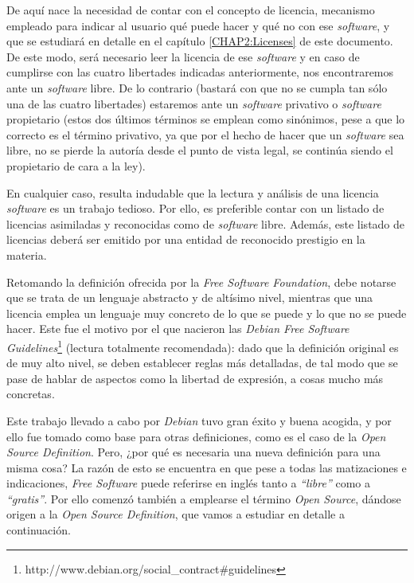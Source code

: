 De aquí nace la necesidad de contar con el concepto de licencia, mecanismo
empleado para indicar al usuario qué puede hacer y qué no con ese
\textit{software}, y que se estudiará en detalle en el capítulo
\ref{CHAP2:Licenses} de este documento. De este modo, será necesario
leer la licencia de ese \textit{software} y en caso de cumplirse con las cuatro
libertades indicadas anteriormente, nos encontraremos ante un \textit{software}
libre. De lo contrario (bastará con que no se cumpla tan sólo una de las cuatro
libertades) estaremos ante un \textit{software} privativo o \textit{software}
propietario (estos dos últimos términos se emplean como sinónimos, pese a que lo
correcto es el término privativo, ya que por el hecho de hacer que un
\textit{software} sea libre, no se pierde la autoría desde el punto de vista
legal, se continúa siendo el propietario de cara a la ley).

En cualquier caso, resulta indudable que la lectura y análisis de una licencia
\textit{software} es un trabajo tedioso. Por ello, es preferible contar con un
listado de licencias asimiladas y reconocidas como de \textit{software} libre.
Además, este listado de licencias deberá ser emitido por una entidad de
reconocido prestigio en la materia.

Retomando la definición ofrecida por la \textit{Free Software Foundation}, debe
notarse que se trata de un lenguaje abstracto y de altísimo nivel, mientras que
una licencia emplea un lenguaje muy concreto de lo que se puede y lo que no se
puede hacer. Este fue el motivo por el que nacieron las \textit{Debian Free
Software Guidelines}\footnote{http://www.debian.org/social_contract#guidelines}
(lectura totalmente recomendada): dado que la definición original es de muy alto
nivel, se deben establecer reglas más detalladas, de tal modo que se pase de
hablar de aspectos como la libertad de expresión, a cosas mucho más concretas.

Este trabajo llevado a cabo por \textit{Debian} tuvo gran éxito y buena acogida,
y por ello fue tomado como base para otras definiciones, como es el caso de
la \textit{Open Source Definition}. Pero, ¿por qué es necesaria una nueva
definición para una misma cosa? La razón de esto se encuentra en que pese a
todas las matizaciones e indicaciones, \textit{Free Software} puede referirse en
inglés tanto a \textit{``libre''} como a \textit{``gratis''}. Por ello comenzó
también a emplearse el término \textit{Open Source}, dándose origen a la
\textit{Open Source Definition}, que vamos a estudiar en detalle a continuación.


